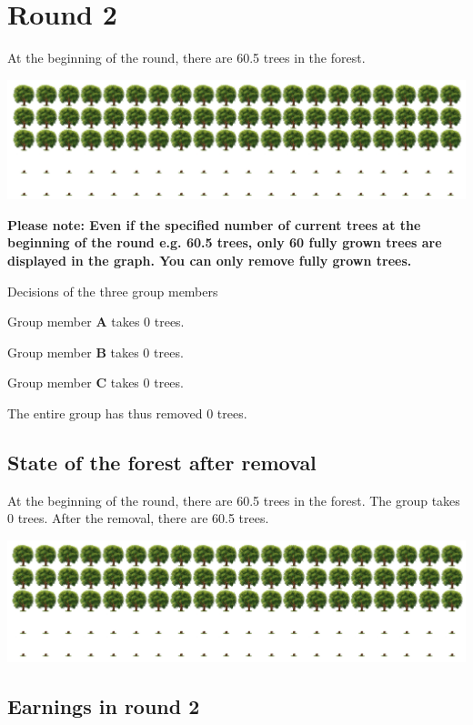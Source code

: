 \section*{Round 2}

At the beginning of the round, there are 60.5 trees in the forest.
\begin{center}
   \includegraphics[width=16cm]{../bld/graphs/A. Round2a.png}
\end{center}

\noindent \textbf{Please note: Even if the specified number of current trees at the beginning of the round e.g. 60.5 trees, only 60 fully grown trees are displayed in the graph. You can only remove fully grown trees.}

\noindent Decisions of the three group members

\noindent Group member \textbf{A} takes 0 trees.

\noindent Group member \textbf{B} takes 0 trees.

\noindent Group member \textbf{C} takes 0 trees.

\noindent The entire group has thus removed 0 trees.


\subsection*{State of the forest after removal}

At the beginning of the round, there are 60.5 trees in the forest. The group takes 0 trees. After the removal, there are 60.5 trees.
\begin{center}
   \includegraphics[width=16cm]{../bld/graphs/A. Round2b.png}
\end{center}

\subsection*{Earnings in round 2}

